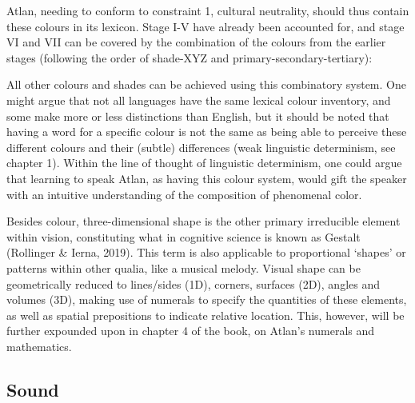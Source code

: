 Atlan, needing to conform to constraint 1, cultural neutrality, should thus contain these colours in its lexicon. Stage I-V have already been accounted for, and stage VI and VII can be covered by the combination of the colours from the earlier stages (following the order of shade-XYZ and primary-secondary-tertiary): 


All other colours and shades can be achieved using this combinatory system. One might argue that not all languages have the same lexical colour inventory, and some make more or less distinctions than English, but it should be noted that having a word for a specific colour is not the same as being able to perceive these different colours and their (subtle) differences (weak linguistic determinism, see chapter 1). Within the line of thought of linguistic determinism, one could argue that learning to speak Atlan, as having this colour system, would gift the speaker with an intuitive understanding of the composition of phenomenal color. 

Besides colour, three-dimensional shape is the other primary irreducible element within vision, constituting what in cognitive science is known as Gestalt (Rollinger \& Ierna, 2019). This term is also applicable to proportional ‘shapes’ or patterns within other qualia, like a musical melody. Visual shape can be geometrically reduced to lines/sides (1D), corners, surfaces (2D), angles and volumes (3D), making use of numerals to specify the quantities of these elements, as well as spatial prepositions to indicate relative location. This, however, will be further expounded upon in chapter 4 of the book, on Atlan’s numerals and mathematics.  


\subsection{Sound}

